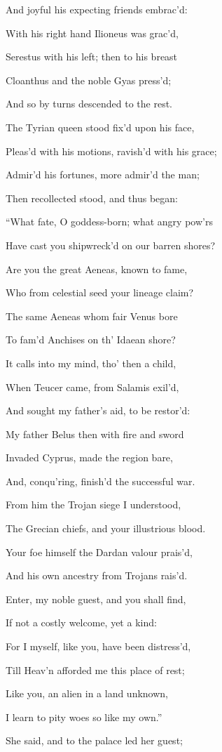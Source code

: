 And joyful his expecting friends embrac’d:

With his right hand Ilioneus was grac’d,

Serestus with his left; then to his breast

Cloanthus and the noble Gyas press’d;

And so by turns descended to the rest.

The Tyrian queen stood fix’d upon his face,

Pleas’d with his motions, ravish’d with his grace;

Admir’d his fortunes, more admir’d the man;

Then recollected stood, and thus began:

“What fate, O goddess-born; what angry pow’rs

Have cast you shipwreck’d on our barren shores?

Are you the great Aeneas, known to fame,

Who from celestial seed your lineage claim?

The same Aeneas whom fair Venus bore

To fam’d Anchises on th’ Idaean shore?

It calls into my mind, tho’ then a child,

When Teucer came, from Salamis exil’d,

And sought my father’s aid, to be restor’d:

My father Belus then with fire and sword

Invaded Cyprus, made the region bare,

And, conqu’ring, finish’d the successful war.

From him the Trojan siege I understood,

The Grecian chiefs, and your illustrious blood.

Your foe himself the Dardan valour prais’d,

And his own ancestry from Trojans rais’d.

Enter, my noble guest, and you shall find,

If not a costly welcome, yet a kind:

For I myself, like you, have been distress’d,

Till Heav’n afforded me this place of rest;

Like you, an alien in a land unknown,

I learn to pity woes so like my own.”

She said, and to the palace led her guest;

